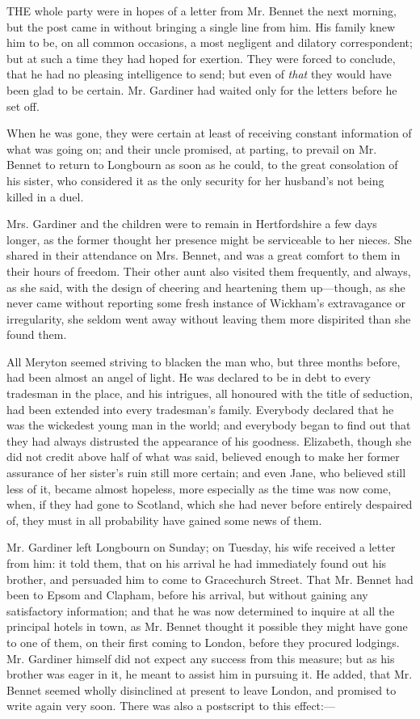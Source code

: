 \documentclass[12pt,openright]{book}
\begin{document}
\noindent  THE whole party were in hopes of a letter from Mr. Bennet the next morning, but the post came in without bringing a single line from him. His family knew him to be, on all common occasions, a most negligent and dilatory correspondent; but at such a time they had hoped for exertion. They were forced to conclude, that he had no pleasing intelligence to send; but even of \textit{that} they would have been glad to be certain. Mr. Gardiner had waited only for the letters before he set off.

When he was gone, they were certain at least of receiving constant information of what was going on; and their uncle promised, at parting, to prevail on Mr. Bennet to return to Longbourn as soon as he could, to the great consolation of his sister, who considered it as the only security for her husband’s not being killed in a duel.

Mrs. Gardiner and the children were to remain in Hertfordshire a few days longer, as the former thought her presence might be serviceable to her nieces. She shared in their attendance on Mrs. Bennet, and was a great comfort to them in their hours of freedom. Their other aunt also visited them frequently, and always, as she said, with the design of cheering and heartening them up—though, as she never came without reporting some fresh instance of Wickham’s extravagance or irregularity, she seldom went away without leaving them more dispirited than she found them.

All Meryton seemed striving to blacken the man who, but three months before, had been almost an angel of light. He was declared to be in debt to every tradesman in the place, and his intrigues, all honoured with the title of seduction, had been extended into every tradesman’s family. Everybody declared that he was the wickedest young man in the world; and everybody began to find out that they had always distrusted the appearance of his goodness. Elizabeth, though she did not credit above half of what was said, believed enough to make her former assurance of her sister’s ruin still more certain; and even Jane, who believed still less of it, became almost hopeless, more especially as the time was now come, when, if they had gone to Scotland, which she had never before entirely despaired of, they must in all probability have gained some news of them.

Mr. Gardiner left Longbourn on Sunday; on Tuesday, his wife received a letter from him: it told them, that on his arrival he had immediately found out his brother, and persuaded him to come to Gracechurch Street. That Mr. Bennet had been to Epsom and Clapham, before his arrival, but without gaining any satisfactory information; and that he was now determined to inquire at all the principal hotels in town, as Mr. Bennet thought it possible they might have gone to one of them, on their first coming to London, before they procured lodgings. Mr. Gardiner himself did not expect any success from this measure; but as his brother was eager in it, he meant to assist him in pursuing it. He added, that Mr. Bennet seemed wholly disinclined at present to leave London, and promised to write again very soon. There was also a postscript to this effect:—
\end{document}

